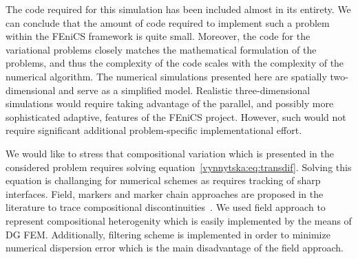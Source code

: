 The code required for this simulation has been included almost in its
entirety. We can conclude that the amount of code required to
implement such a problem within the FEniCS framework is quite
small. Moreover, the code for the variational problems closely matches
the mathematical formulation of the problems, and thus the complexity
of the code scales with the complexity of the numerical algorithm.
The numerical simulations presented here are spatially two-dimensional
and serve as a simplified model. Realistic three-dimensional
simulations would require taking advantage of the parallel, and
possibly more sophisticated adaptive, features of the FEniCS
project. However, such would not require significant additional
problem-specific implementational effort.

We would like to stress that compositional variation which is
presented in the considered problem requires solving
equation~\eqref{vynnytska:eq:transdif}.  Solving this equation is
challanging for numerical schemes as requires tracking of sharp
interfaces.  Field, markers and marker chain approaches are proposed
in the literature to trace compositional
discontinuities~\cite{IsmailZadehTackley2010}. We used field approach
to represent compositional heterogenity which is easily implemented by
the means of DG FEM. Additionally, filtering scheme is implemented in
order to minimize numerical dispersion error which is the main
disadvantage of the field approach.


